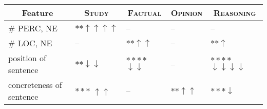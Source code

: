 \begin{table}[t]
{
\fontsize{8.5}{9}\selectfont
\setlength{\tabcolsep}{1.1mm}

\begin{tabular}{|p{1.5cm}|p{1.1cm}|p{1.1cm}|p{1.1cm}|p{1.3cm}|}
    \hline
    \multicolumn{1}{|c|}{Feature} & 
    \multicolumn{1}{c|}{\textsc{Study}} & 
    \multicolumn{1}{c|}{\textsc{Factual}} & 
    \multicolumn{1}{c|}{\textsc{Opinion}} & 
    \multicolumn{1}{c|}{\textsc{Reasoning}}  \\ \hline
    
    
    \# PERC, NE & $\ast\ast\uparrow\uparrow\uparrow\uparrow$ & -- & -- & --  \\ \hline
    
    
    \# LOC, NE & -- & $\ast\ast\uparrow\uparrow$ & -- & $\ast\ast\uparrow$  \\ \hline
    
    position \newline of sentence & $\ast\ast\downarrow\downarrow$ &  $\ast\ast\ast\ast$ $\downarrow\downarrow$ & -- & $\ast\ast\ast\ast$ $\downarrow\downarrow\downarrow\downarrow$ \\ \hline
    
    concreteness \newline of sentence&  $\ast\ast\ast$ $\uparrow\uparrow$ & -- & $\ast\ast\uparrow\uparrow$ & $\ast\ast\ast\downarrow$  \\ \hline
    
    
    

\end{tabular}}
\end{table}
